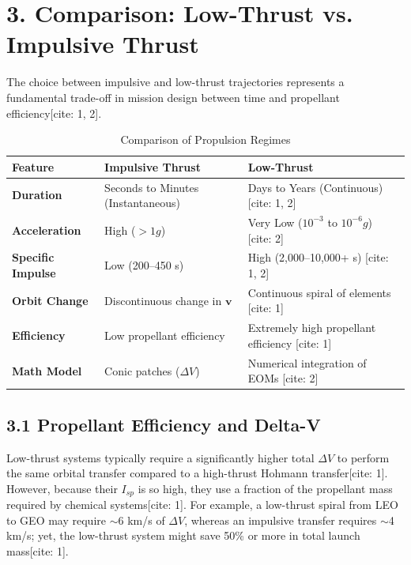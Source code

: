 \documentclass[11pt, a4paper]{article}
\begin{document}
\section{3. Comparison: Low-Thrust vs. Impulsive Thrust}
The choice between impulsive and low-thrust trajectories represents a fundamental trade-off in mission design between time and propellant efficiency[cite: 1, 2].

\begin{table}[h!]
\centering
\begin{tabular}{lll}
\toprule
\textbf{Feature} & \textbf{Impulsive Thrust} & \textbf{Low-Thrust} \\
\midrule
\textbf{Duration} & Seconds to Minutes (Instantaneous) & Days to Years (Continuous) [cite: 1, 2] \\
\textbf{Acceleration} & High ($> 1g$) & Very Low ($10^{-3}$ to $10^{-6}g$) [cite: 2] \\
\textbf{Specific Impulse} & Low (200--450 s) & High (2,000--10,000+ s) [cite: 1, 2] \\
\textbf{Orbit Change} & Discontinuous change in $\mathbf{v}$ & Continuous spiral of elements [cite: 1] \\
\textbf{Efficiency} & Low propellant efficiency & Extremely high propellant efficiency [cite: 1] \\
\textbf{Math Model} & Conic patches ($\Delta V$) & Numerical integration of EOMs [cite: 2] \\
\bottomrule
\end{tabular}
\caption{Comparison of Propulsion Regimes}
\end{table}

\subsection{3.1 Propellant Efficiency and Delta-V}
Low-thrust systems typically require a significantly higher total $\Delta V$ to perform the same orbital transfer compared to a high-thrust Hohmann transfer[cite: 1]. However, because their $I_{sp}$ is so high, they use a fraction of the propellant mass required by chemical systems[cite: 1]. For example, a low-thrust spiral from LEO to GEO may require $\sim$6 km/s of $\Delta V$, whereas an impulsive transfer requires $\sim$4 km/s; yet, the low-thrust system might save 50\% or more in total launch mass[cite: 1].
\end{document}
